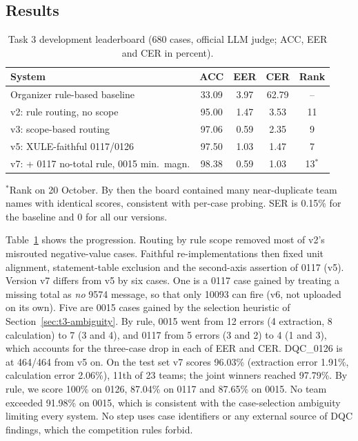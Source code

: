 \documentclass[conference]{IEEEtran}
\begin{document}
\subsection{Results}
\begin{table}[t]
\centering
\caption{Task 3 development leaderboard (680 cases, official LLM judge; ACC, EER and CER in percent).}
\label{tab:task3}
\setlength{\tabcolsep}{4.5pt}
\begin{tabular}{@{}lcccc@{}}
\toprule
System & ACC & EER & CER & Rank \\
\midrule
Organizer rule-based baseline & 33.09 & 3.97 & 62.79 & -- \\
v2: rule routing, no scope & 95.00 & 1.47 & 3.53 & 11 \\
v3: scope-based routing & 97.06 & 0.59 & 2.35 & 9 \\
v5: XULE-faithful 0117/0126 & 97.50 & 1.03 & 1.47 & 7 \\
v7: + 0117 no-total rule, 0015 min.\ magn. & 98.38 & 0.59 & 1.03 & 13$^\ast$ \\
\bottomrule
\end{tabular}

\smallskip
\raggedright\footnotesize $^\ast$Rank on 20 October. By then the board contained many near-duplicate team names with
identical scores, consistent with per-case probing. SER is 0.15\% for the baseline and 0 for all our versions.
\end{table}
Table~\ref{tab:task3} shows the progression. Routing by rule scope removed most of v2's misrouted negative-value
cases. Faithful re-implementations then fixed unit alignment, statement-table exclusion and the second-axis
assertion of 0117 (v5). Version v7 differs from v5 by six cases. One is a 0117 case gained by treating a missing
total as \emph{no} 9574 message, so that only 10093 can fire (v6, not uploaded on its own). Five are 0015 cases gained
by the selection heuristic of Section~\ref{sec:t3-ambiguity}. By rule, 0015 went from 12 errors (4 extraction, 8
calculation) to 7 (3 and 4), and 0117 from 5 errors (3 and 2) to 4 (1 and 3), which accounts for the three-case drop
in each of EER and CER. DQC\_0126 is at 464/464 from v5 on. On the test set v7 scores 96.03\% (extraction error
1.91\%, calculation
error 2.06\%), 11th of 23 teams; the joint winners reached 97.79\%. By rule, we score 100\% on 0126, 87.04\% on 0117
and 87.65\% on 0015. No team exceeded 91.98\% on 0015, which is consistent with the case-selection ambiguity limiting
every system. No step uses case identifiers or any external source of
DQC findings, which the competition rules forbid.
\end{document}
